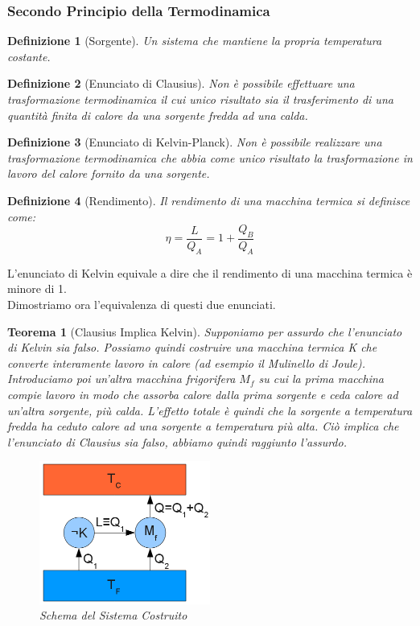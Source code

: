 \documentclass{article}
\newtheorem{thm}{Teorema}[section]
\newtheorem{defn}{Definizione}[section]
\newcommand{\note}{\noindent {\quad \bf \underline{Osservazione:}} \quad}
\begin{document}
\subsubsection{Secondo Principio della Termodinamica}
\begin{defn}[Sorgente]
Un sistema che mantiene la propria temperatura costante.
\end{defn}
\begin{defn}[Enunciato di Clausius]
Non è possibile effettuare una trasformazione termodinamica il cui unico risultato sia il trasferimento di una quantità finita di calore da una sorgente fredda ad una calda.
\end{defn}
\begin{defn}[Enunciato di Kelvin-Planck]
Non è possibile realizzare una trasformazione termodinamica che abbia come unico risultato la trasformazione in lavoro del calore fornito da una sorgente.
\end{defn}
\begin{defn}[Rendimento]
Il rendimento di una macchina termica si definisce come:
\[\eta=\frac{L}{Q_A}=1+\frac{Q_B}{Q_A}\]
\end{defn}
\note L'enunciato di Kelvin equivale a dire che il rendimento di una macchina termica è minore di 1.\\
Dimostriamo ora l'equivalenza di questi due enunciati.
\begin{thm}[Clausius Implica Kelvin]
Supponiamo per assurdo che l'enunciato di Kelvin sia falso. Possiamo quindi costruire una macchina termica K che converte interamente lavoro in calore (ad esempio il Mulinello di Joule). Introduciamo poi un'altra macchina frigorifera $M_f$ su cui la prima macchina compie lavoro in modo che assorba calore dalla prima sorgente e ceda calore ad un'altra sorgente, più calda. L'effetto totale è quindi che la sorgente a temperatura fredda ha ceduto calore ad una sorgente a temperatura più alta. Ciò implica che l'enunciato di Clausius sia falso, abbiamo quindi raggiunto l'assurdo.
\begin{figure}[H]
    \centering
    \includegraphics[width=0.5\textwidth]{Kelvin_dimostrazione_assurdo.png}
    \caption{Schema del Sistema Costruito}
    \label{ClausiusKelvin}
\end{figure}
\end{thm}
\end{document}
